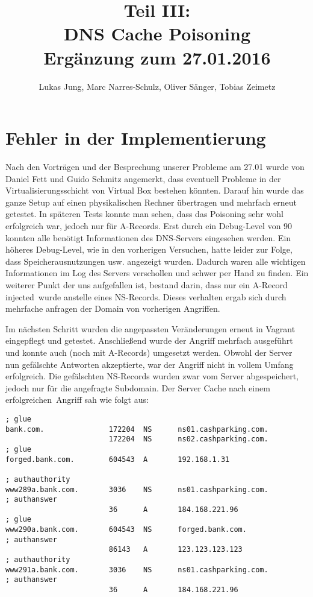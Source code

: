 \documentclass[10pt,a4paper]{article}
\author{Lukas Jung, Marc Narres-Schulz, Oliver Sänger, Tobias Zeimetz}
\title{Teil III: \\DNS Cache Poisoning \\Ergänzung zum 27.01.2016}
\begin{document}
\maketitle
\newpage

\section{Fehler in der Implementierung}
Nach den Vorträgen und der Besprechung unserer Probleme am 27.01 wurde von Daniel Fett und Guido Schmitz angemerkt, dass eventuell Probleme in der Virtualisierungsschicht von Virtual Box bestehen könnten. Darauf hin wurde das ganze Setup auf einen physikalischen Rechner übertragen und mehrfach erneut getestet. In späteren Tests konnte man sehen, dass das Poisoning sehr wohl erfolgreich war, jedoch nur für A-Records. Erst durch ein Debug-Level von 90 konnten alle benötigt Informationen des DNS-Servers eingesehen werden. Ein höheres Debug-Level, wie in den vorherigen Versuchen, hatte leider zur Folge, dass Speicherausnutzungen usw. angezeigt wurden. Dadurch waren alle wichtigen Informationen im Log des Servers verschollen und schwer per Hand zu finden. Ein weiterer Punkt der uns aufgefallen ist, bestand darin, dass nur ein A-Record \glqq injected\grqq\ wurde anstelle eines NS-Records. Dieses verhalten ergab sich durch mehrfache anfragen der Domain von vorherigen Angriffen. 

Im nächsten Schritt wurden die angepassten Veränderungen erneut in Vagrant eingepflegt und getestet. Anschließend wurde der Angriff mehrfach ausgeführt und konnte auch (noch mit A-Records) umgesetzt werden. Obwohl der Server nun gefälschte Antworten akzeptierte, war der Angriff nicht in vollem Umfang erfolgreich. Die gefälschten NS-Records wurden zwar vom Server abgespeichert, jedoch nur für die angefragte Subdomain. Der Server Cache nach einem \glqq erfolgreichen\grqq\ Angriff sah wie folgt aus:
\begin{center}
\begin{lstlisting}
; glue
bank.com.               172204  NS      ns01.cashparking.com.
						172204  NS      ns02.cashparking.com.
; glue
forged.bank.com.        604543  A       192.168.1.31

; authauthority
www289a.bank.com.       3036    NS      ns01.cashparking.com.
; authanswer
						36      A       184.168.221.96
; glue
www290a.bank.com.       604543  NS      forged.bank.com.
; authanswer
						86143   A       123.123.123.123
; authauthority
www291a.bank.com.       3036    NS      ns01.cashparking.com.
; authanswer
						36      A       184.168.221.96
\end{lstlisting}
\end{center}
\end{document}

